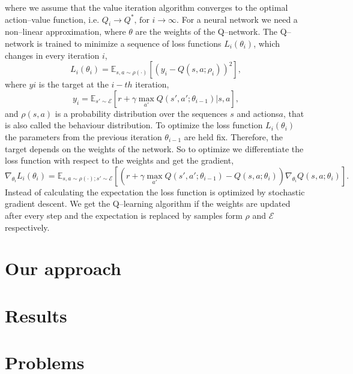 where we assume that the value iteration algorithm converges to the optimal action--value function, i.e. $Q_i \rightarrow Q^*\text{, for } i \rightarrow \infty$.
For a neural network we need a non--linear approximation, where $\theta$ are the weights of the Q--network.
The Q--network is trained to minimize a sequence of loss functions $L_i\left(\theta_i\right)$, which changes in every iteration $i$,
\begin{equation}
L_i\left(\theta_i\right)= \mathbb{E}_{s,a \sim \rho \left( \cdot \right)}\left[ \left( y_i - Q\left(s,a;\rho_i \right) \right)^2\right],
\end{equation}
where $yi$ is the target at the $i-th$ iteration,
\begin{equation}
y_i = \mathbb{E}_{s'\sim \mathcal{E}}\left[ r+ \gamma \max_{a'} Q\left( s',a'; \theta_{i-1}\right)| s,a\right],
\end{equation}
and $\rho\left(s,a\right)$ is a probability distribution over the sequences $s$ and actions$a$, that is also called the behaviour distribution.
To optimize the loss function $L_i\left(\theta_i\right)$ the parameters from the previous iteration $\theta_{i-1}$ are held fix. 
Therefore, the target depends on the weights of the network. 
So to optimize we differentiate the loss function with respect to the weights and get the gradient,
\begin{equation}
\nabla_{\theta_i} L_i\left(\theta_i\right)= \mathbb{E}_{s,a\sim\rho\left(\cdot\right);s'\sim \mathcal{E}} \left[ \left( r + \gamma \max_{a'}Q\left(s',a';\theta_{i-1}\right) -Q\left(s,a;\theta_i\right) \right)\nabla_{\theta_i}Q\left(s,a;\theta_i\right)\right].
\end{equation}
Instead of calculating the expectation the loss function is optimized by stochastic gradient descent. 
We get the Q--learning algorithm if the weights are updated after every step and the expectation is replaced by samples form $\rho$ and $\mathcal{E}$ respectively.

\section{Our approach}

\section{Results}

\section{Problems}